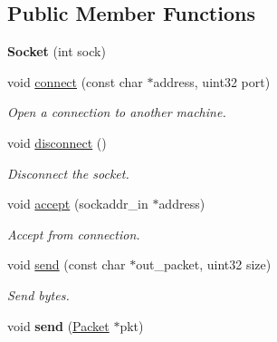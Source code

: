 \subsection*{\-Public \-Member \-Functions}
\begin{DoxyCompactItemize}
\item 
\hypertarget{classSocket_acba9bcb13219372b3236ebd45edc29fb}{{\bfseries \-Socket} (int sock)}\label{classSocket_acba9bcb13219372b3236ebd45edc29fb}

\item 
\hypertarget{classSocket_a05d03ffaefb03f6bb07e5f5dcdb8c3cd}{void \hyperlink{classSocket_a05d03ffaefb03f6bb07e5f5dcdb8c3cd}{connect} (const char $\ast$address, uint32 port)}\label{classSocket_a05d03ffaefb03f6bb07e5f5dcdb8c3cd}

\begin{DoxyCompactList}\small\item\em \-Open a connection to another machine. \end{DoxyCompactList}\item 
\hypertarget{classSocket_a0aed22a4e59d0492ee5ed6d5c89ef762}{void \hyperlink{classSocket_a0aed22a4e59d0492ee5ed6d5c89ef762}{disconnect} ()}\label{classSocket_a0aed22a4e59d0492ee5ed6d5c89ef762}

\begin{DoxyCompactList}\small\item\em \-Disconnect the socket. \end{DoxyCompactList}\item 
\hypertarget{classSocket_a2d86a782f8bd8c002a4a92feffaf0180}{void \hyperlink{classSocket_a2d86a782f8bd8c002a4a92feffaf0180}{accept} (sockaddr\-\_\-in $\ast$address)}\label{classSocket_a2d86a782f8bd8c002a4a92feffaf0180}

\begin{DoxyCompactList}\small\item\em \-Accept from connection. \end{DoxyCompactList}\item 
\hypertarget{classSocket_abe848a0d3a96711d1cc0a8c10d5d066b}{void \hyperlink{classSocket_abe848a0d3a96711d1cc0a8c10d5d066b}{send} (const char $\ast$out\-\_\-packet, uint32 size)}\label{classSocket_abe848a0d3a96711d1cc0a8c10d5d066b}

\begin{DoxyCompactList}\small\item\em \-Send bytes. \end{DoxyCompactList}\item 
\hypertarget{classSocket_ae77c62ce4c867e1ae501fbc355bf9f6a}{void {\bfseries send} (\hyperlink{structPacket}{\-Packet} $\ast$pkt)}\label{classSocket_ae77c62ce4c867e1ae501fbc355bf9f6a}


\end{DoxyCompactItemize}
